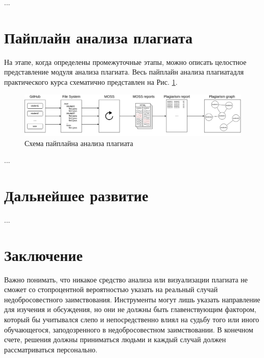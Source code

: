 \documentclass{article}
\begin{document}
...

\section{Пайплайн анализа плагиата}

На этапе, когда определены промежуточные этапы, можно описать целостное представление модуля анализа плагиата. Весь пайплайн анализа плагиатадля практического курса схематично представлен на Рис. \ref{fig:pipeline}.

\begin{figure}[h!]
\centering
\includegraphics[width=1.0\textwidth]{graph2viz.png}
\caption{Схема пайплайна анализа плагиата}
\label{fig:pipeline}
\end{figure}

...

\section{Дальнейшее развитие}

...

\section{Заключение}

Важно понимать, что никакое средство анализа или визуализации плагиата не сможет со стопроцентной вероятностью указать на реальный случай недобросовестного заимствования. Инструменты могут лишь указать направление для изучения и обсуждения, но они не должны быть главенствующим фактором, который бы учитывался слепо и непосредственно влиял на судьбу того или иного обучающегося, заподозренного в недобросовестном заимствовании. В конечном счете, решения должны приниматься людьми и каждый случай должен рассматриваться персонально.



\end{document}
